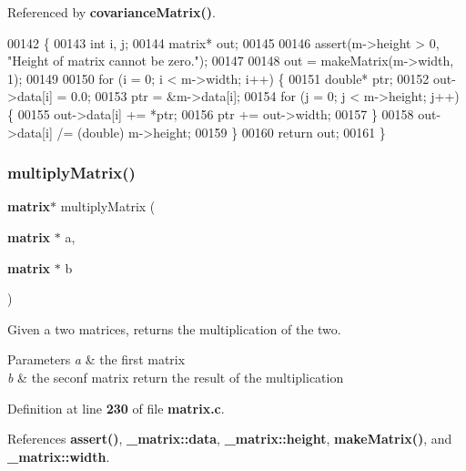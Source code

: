 Referenced by \textbf{ covariance\+Matrix()}.


\begin{DoxyCode}
00142                               \{
00143     \textcolor{keywordtype}{int} i, j;
00144     matrix* out;
00145 
00146     assert(m->height > 0, \textcolor{stringliteral}{"Height of matrix cannot be zero."});
00147 
00148     out = makeMatrix(m->width, 1);
00149 
00150     \textcolor{keywordflow}{for} (i = 0; i < m->width; i++) \{
00151         \textcolor{keywordtype}{double}* ptr;
00152         out->data[i] = 0.0;
00153         ptr = &m->data[i];
00154         \textcolor{keywordflow}{for} (j = 0; j < m->height; j++) \{
00155             out->data[i] += *ptr;
00156             ptr += out->width;
00157         \}
00158         out->data[i] /= (double) m->height;
00159     \}
00160     \textcolor{keywordflow}{return} out;
00161 \}
\end{DoxyCode}
\mbox{\label{matrix_8h_a63ed5c518b34768e9ef8e9d5f7d0b534}} 
\subsubsection{multiply\+Matrix()}
{\footnotesize\ttfamily \textbf{ matrix}$\ast$ multiply\+Matrix (\begin{DoxyParamCaption}\item[{\textbf{ matrix} $\ast$}]{a,  }\item[{\textbf{ matrix} $\ast$}]{b }\end{DoxyParamCaption})}



Given a two matrices, returns the multiplication of the two. 


\begin{DoxyParams}{Parameters}
{\em a} & the first matrix \\
\hline
{\em b} & the seconf matrix return the result of the multiplication \\
\hline
\end{DoxyParams}


Definition at line \textbf{ 230} of file \textbf{ matrix.\+c}.



References \textbf{ assert()}, \textbf{ \+\_\+matrix\+::data}, \textbf{ \+\_\+matrix\+::height}, \textbf{ make\+Matrix()}, and \textbf{ \+\_\+matrix\+::width}.


